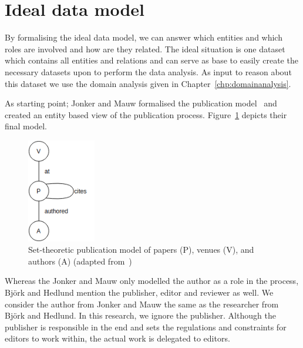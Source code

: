 \documentclass{ou-report}
\begin{document}
\section{Ideal data model}
By formalising the ideal data model, we can answer which entities and which 
roles are involved and how are they related.
The ideal situation is one dataset which contains all entities and relations 
and can serve as base to easily create the necessary datasets upon to perform 
the data analysis. As 
input to reason about this dataset we use the domain analysis given in 
Chapter~\ref{chp:domainanalysis}.

As starting point; Jonker and Mauw formalised the publication model~\cite{JM2017} 
and created an entity based view of the publication process. 
Figure~\ref{fig:jm2017_induced_pub_model} depicts their final model.
\begin{figure}[H]
\centering
\includegraphics[width=3cm]{images/jm2017_undiced_pub_view.drawio.png}
\caption{Set-theoretic publication model of papers (P), venues (V), and 
authors (A) (adapted from~\cite{JM2017})}
\label{fig:jm2017_induced_pub_model}
\end{figure}


Whereas the Jonker and Mauw only modelled the author as a role in the process, 
Bj\"ork and Hedlund mention the publisher, editor and reviewer as well. 
We consider the author from Jonker and Mauw the same as the researcher from 
Bj\"ork and Hedlund. In this research, we ignore the publisher. Although the 
publisher is responsible in the end and sets the regulations and constraints for 
editors to work within, the actual work is delegated to editors.
\end{document}
